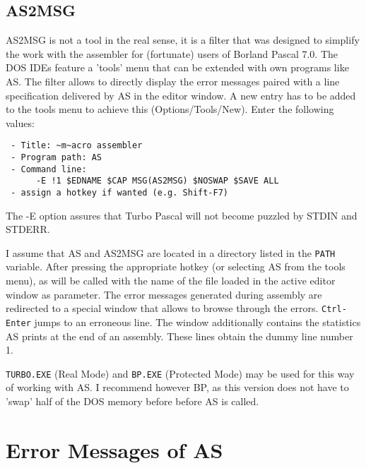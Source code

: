 \documentclass[12pt,twoside]{report}
\newcommand{\tty}[1]{{\tt #1}}
\begin{document}

\section{AS2MSG}

AS2MSG is not a tool in the real sense, it is a filter that was
designed to simplify the work with the assembler for (fortunate)
users of Borland Pascal 7.0.  The DOS IDEs feature a 'tools' menu
that can be extended with own programs like AS.  The filter allows to
directly display the error messages paired with a line
specification delivered by AS in the editor window.  A new entry has
to be added to the tools menu to achieve this (Options/Tools/New).
Enter the following values:
\begin{verbatim}
 - Title: ~m~acro assembler
 - Program path: AS
 - Command line:
      -E !1 $EDNAME $CAP MSG(AS2MSG) $NOSWAP $SAVE ALL
 - assign a hotkey if wanted (e.g. Shift-F7)
\end{verbatim}
The -E option assures that Turbo Pascal will not become puzzled by
STDIN and STDERR.

I assume that AS and AS2MSG are located in a directory listed in the
\tty{PATH} variable.  After pressing the appropriate hotkey (or selecting
AS from the tools menu), as will be called with the name of the file
loaded in the active editor window as parameter.  The error messages
generated during assembly are redirected to a special window that
allows to browse through the errors.  \tty{Ctrl-Enter} jumps to an
erroneous line.  The window additionally contains the statistics AS
prints at the end of an assembly.  These lines obtain the dummy line
number 1.

\tty{TURBO.EXE} (Real Mode) and \tty{BP.EXE} (Protected Mode) may be used for
this way of working with AS.  I recommend however BP, as this version
does not have to 'swap' half of the DOS memory before before AS is
called.

\appendix

\cleardoublepage
\chapter{Error Messages of AS}
\label{ChapErrMess}
\end{document}
